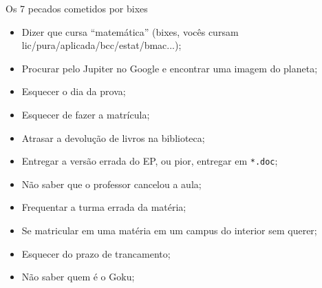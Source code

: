 \begin{editorial}{Os 7 pecados cometidos por bixes}

\begin{itemize}
  \item Dizer que cursa ``matemática'' (bixes, vocês cursam
        lic/pura/aplicada/bcc/estat/bmac...);
  \item Procurar pelo Jupiter no Google e encontrar uma imagem do planeta;
  \item Esquecer o dia da prova;
  \item Esquecer de fazer a matrícula;
  \item Atrasar a devolução de livros na biblioteca;
  \item Entregar a versão errada do EP, ou pior, entregar em \texttt{*.doc};
  \item Não saber que o professor cancelou a aula;
  \item Frequentar a turma errada da matéria;
  \item Se matricular em uma matéria em um campus do interior sem querer;
  \item Esquecer do prazo de trancamento;
  \item Não saber quem é o Goku;


\end{itemize}
\end{editorial}

